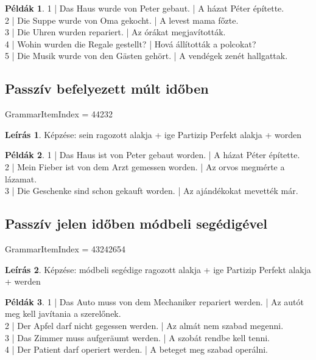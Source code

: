 \documentclass{article}
\theoremstyle{definition}
\newtheorem*{exmp}{Példák}
\newtheorem*{desc}{Leírás}
\begin{document}
\begin{exmp}
1 | Das Haus wurde von Peter gebaut. | A házat Péter építette.\\
2 | Die Suppe wurde von Oma gekocht. | A levest mama főzte.\\
3 | Die Uhren wurden repariert. | Az órákat megjavították.\\
4 | Wohin wurden die Regale gestellt? | Hová állították a polcokat?\\
5 | Die Musik wurde von den Gästen gehört. | A vendégek zenét hallgattak.\\
\end{exmp}

\subsection{Passzív befelyezett múlt időben}

GrammarItemIndex = 44232

\begin{desc}
Képzése: sein ragozott alakja + ige Partizip Perfekt alakja + worden
\end{desc}

\begin{exmp}
1 | Das Haus ist von Peter gebaut worden. | A házat Péter építette.\\
2 | Mein Fieber ist von dem Arzt gemessen worden. | Az orvos megmérte a lázamat.\\
3 | Die Geschenke sind schon gekauft worden. | Az ajándékokat mevették már.\\
\end{exmp}

\subsection{Passzív jelen időben módbeli segédigével}

GrammarItemIndex = 43242654

\begin{desc}
Képzése: módbeli segédige ragozott alakja + ige Partizip Perfekt alakja + werden
\end{desc}

\begin{exmp}
1 | Das Auto muss von dem Mechaniker repariert werden. | Az autót meg kell javítania a szerelőnek.\\
2 | Der Apfel darf nicht gegessen werden. | Az almát nem szabad megenni.\\
3 | Das Zimmer muss aufgeräumt werden. | A szobát rendbe kell tenni.\\
4 | Der Patient darf operiert werden. | A beteget meg szabad operálni.\\
\end{exmp}
\end{document}
